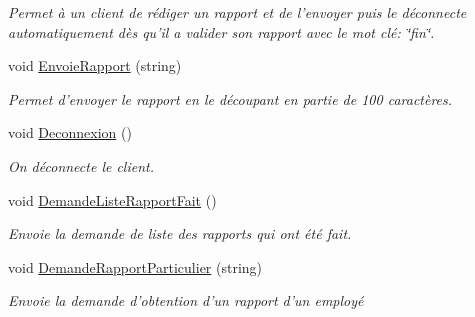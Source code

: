 \begin{DoxyCompactItemize}
\begin{DoxyCompactList}\small\item\em \-Permet à un client de rédiger un rapport et de l'envoyer puis le déconnecte automatiquement dès qu'il a valider son rapport avec le mot clé\-: \char`\"{}fin\char`\"{}. \end{DoxyCompactList}\item 
\hypertarget{class_employe_af06334bbd7bede0c1aba369fae38c976}{void \hyperlink{class_employe_af06334bbd7bede0c1aba369fae38c976}{\-Envoie\-Rapport} (string)}\label{class_employe_af06334bbd7bede0c1aba369fae38c976}

\begin{DoxyCompactList}\small\item\em \-Permet d'envoyer le rapport en le découpant en partie de 100 caractères. \end{DoxyCompactList}\item 
\hypertarget{class_employe_a8c8fd0b2b74e124fd8df67660f0a5ae9}{void \hyperlink{class_employe_a8c8fd0b2b74e124fd8df67660f0a5ae9}{\-Deconnexion} ()}\label{class_employe_a8c8fd0b2b74e124fd8df67660f0a5ae9}

\begin{DoxyCompactList}\small\item\em \-On déconnecte le client. \end{DoxyCompactList}\item 
\hypertarget{class_employe_ad22a2e810ba9abebd7a157c5b50981f8}{void \hyperlink{class_employe_ad22a2e810ba9abebd7a157c5b50981f8}{\-Demande\-Liste\-Rapport\-Fait} ()}\label{class_employe_ad22a2e810ba9abebd7a157c5b50981f8}

\begin{DoxyCompactList}\small\item\em \-Envoie la demande de liste des rapports qui ont été fait. \end{DoxyCompactList}\item 
\hypertarget{class_employe_ac622094a90202336d5357d27615edf33}{void \hyperlink{class_employe_ac622094a90202336d5357d27615edf33}{\-Demande\-Rapport\-Particulier} (string)}\label{class_employe_ac622094a90202336d5357d27615edf33}

\begin{DoxyCompactList}\small\item\em \-Envoie la demande d'obtention d'un rapport d'un employé \end{DoxyCompactList}\end{DoxyCompactItemize}
